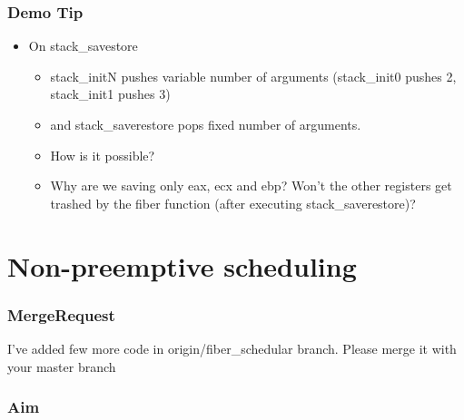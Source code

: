 \documentclass[]{book}
\newenvironment{Shaded}{}{}
\newcommand{\KeywordTok}[1]{\textbf{{#1}}}
\newcommand{\NormalTok}[1]{{#1}}
\begin{document}
\subsubsection*{Demo Tip}\label{demo-tip-4}

\begin{itemize}
\itemsep1pt\parskip0pt
\item
  On stack\_savestore

  \begin{itemize}
  \itemsep1pt\parskip0pt
  \item
    stack\_initN pushes variable number of arguments (stack\_init0
    pushes 2, stack\_init1 pushes 3)
  \item
    and stack\_saverestore pops fixed number of arguments.
  \item
    How is it possible?
  \item
    Why are we saving only eax, ecx and ebp? Won't the other registers
    get trashed by the fiber function (after executing
    stack\_saverestore)?
  \end{itemize}
\end{itemize}

\section{Non-preemptive scheduling}\label{non-preemptive-scheduling}

\subsubsection*{MergeRequest}\label{mergerequest-6}

I've added few more code in origin/fiber\_schedular branch. Please merge
it with your master branch

\begin{Shaded}
\end{Shaded}

\subsubsection*{Aim}\label{aim-6}
\end{document}
